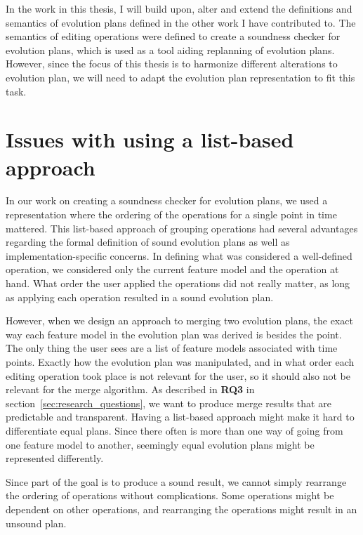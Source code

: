 \documentclass[a4paper,english]{ifimaster}
\begin{document}
In the work in this thesis, I will build upon, alter and extend the definitions and semantics of evolution plans defined in the other work I have contributed to. The semantics of editing operations were defined to create a soundness checker for evolution plans, which is used as a tool aiding replanning of evolution plans. However, since the focus of this thesis is to harmonize different alterations to evolution plan, we will need to adapt the evolution plan representation to fit this task.

\section{Issues with using a list-based approach}%
\label{sec:issues_with_using_a_list_based_approach}

In our work on creating a soundness checker for evolution plans, we used a representation where the ordering of the operations for a single point in time mattered. This list-based approach of grouping operations had several advantages regarding the formal definition of sound evolution plans as well as implementation-specific concerns. In defining what was considered a well-defined operation, we considered only the current feature model and the operation at hand. What order the user applied the operations did not really matter, as long as applying each operation resulted in a sound evolution plan.

However, when we design an approach to merging two evolution plans, the exact way each feature model in the evolution plan was derived is besides the point. The only thing the user sees are a list of feature models associated with time points. Exactly how the evolution plan was manipulated, and in what order each editing operation took place is not relevant for the user, so it should also not be relevant for the merge algorithm. As described in \textbf{RQ3} in section~\ref{sec:research_questions}, we want to produce merge results that are predictable and transparent. Having a list-based approach might make it hard to differentiate equal plans. Since there often is more than one way of going from one feature model to another, seemingly equal evolution plans might be represented differently.

Since part of the goal is to produce a sound result, we cannot simply rearrange the ordering of operations without complications. Some operations might be dependent on other operations, and rearranging the operations might result in an unsound plan. 
\end{document}
